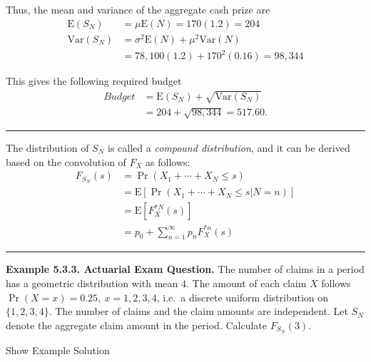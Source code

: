 \documentclass[]{book}
\theoremstyle{definition}
\theoremstyle{definition}
\theoremstyle{definition}
\theoremstyle{remark}
\begin{document}
Thus, the mean and variance of the aggregate cash prize are
\[\begin{aligned}
\mathrm{E}(S_N)  &= \mu \mathrm{E}(N) = 170 (1.2) = 204 \\
\mathrm{Var}(S_N) &= \sigma^2 \mathrm{E}(N) + \mu^2 \mathrm{Var}(N)\\
&= 78,100 (1.2) + 170^2 (0.16) = 98,344
\end{aligned}\]

This gives the following required budget \[\begin{aligned}
Budget &= \mathrm{E}(S_N) + \sqrt{\mathrm{Var}(S_N)} \\
&= 204 + \sqrt{98,344} = 517.60 .
\end{aligned}\]

\begin{center}\rule{0.5\linewidth}{\linethickness}\end{center}

The distribution of \(S_N\) is called a \emph{compound distribution},
and it can be derived based on the convolution of \(F_X\) as follows:
\[\begin{aligned}
F_{S_N}(s) &= \Pr \left(X_1 + \cdots + X_N \le s \right) \\
&=  \mathrm{E} \left[ \Pr \left(X_1 + \cdots + X_N  \le s|N=n \right) \right]\\
&=  \mathrm{E} \left[ F_{X}^{\ast N}(s) \right] \\
&=  p_0 + \sum_{n=1}^{\infty }p_n F_{X}^{\ast n}(s)
\end{aligned}\]

\begin{center}\rule{0.5\linewidth}{\linethickness}\end{center}

\textbf{Example 5.3.3. Actuarial Exam Question.} The number of claims in
a period has a geometric distribution with mean \(4\). The amount of
each claim \(X\) follows \(\Pr(X=x) = 0.25, \ x=1,2,3,4\), i.e.~a
discrete uniform distribution on \(\{1,2,3,4\}\). The number of claims
and the claim amounts are independent. Let \(S_N\) denote the aggregate
claim amount in the period. Calculate \(F_{S_N}(3)\).

Show Example Solution
\end{document}
